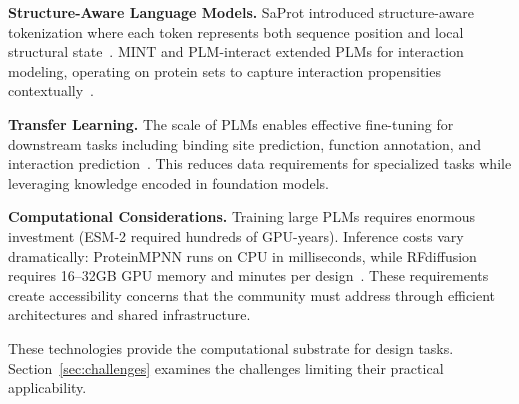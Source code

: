 \textbf{Structure-Aware Language Models.} SaProt introduced structure-aware tokenization where each token represents both sequence position and local structural state~\cite{su2024saprot}. MINT and PLM-interact extended PLMs for interaction modeling, operating on protein sets to capture interaction propensities contextually~\cite{ullanat2025mint,zhao2025plminteract}.

\textbf{Transfer Learning.} The scale of PLMs enables effective fine-tuning for downstream tasks including binding site prediction, function annotation, and interaction prediction~\cite{dallago2024plmfinetune}. This reduces data requirements for specialized tasks while leveraging knowledge encoded in foundation models.

\textbf{Computational Considerations.} Training large PLMs requires enormous investment (ESM-2 required hundreds of GPU-years). Inference costs vary dramatically: ProteinMPNN runs on CPU in milliseconds, while RFdiffusion requires 16--32GB GPU memory and minutes per design~\cite{watson2023rfdiffusion}. These requirements create accessibility concerns that the community must address through efficient architectures and shared infrastructure.

\vspace{0.5em}
\noindent
These technologies provide the computational substrate for design tasks. Section~\ref{sec:challenges} examines the challenges limiting their practical applicability.
